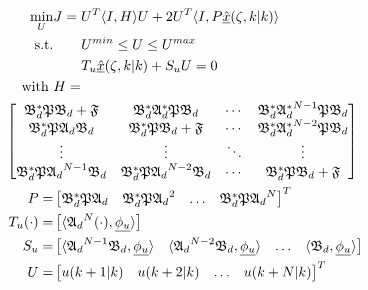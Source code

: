 \begin{equation} \label{eq:MPC_QP}
    \begin{aligned}
        \min_{U} &J = U^T \langle I,H \rangle U + 2U^T \langle I, P \underline{\hat{x}}(\zeta, k|k) \rangle \\
        \text{s.t.} &\qquad U^{min} \leq U \leq U^{max} \\
        &\qquad T_u \underline{\hat{x}}(\zeta, k|k) + S_u U = 0
        \, \\
        \text{with } &H = \\
        &\hspace{-3.5em }\begin{bmatrix}
            \mathfrak{B}_d^* \mathfrak{P} \mathfrak{B}_d + \mathfrak{F} & \mathfrak{B}_d^* \mathfrak{A}_d^* \mathfrak{P} \mathfrak{B}_d & \cdots &  \mathfrak{B}_d^* {\mathfrak{A}_d^*}^{N-1} \mathfrak{P} \mathfrak{B}_d \\
            \mathfrak{B}_d^* \mathfrak{P} \mathfrak{A}_d \mathfrak{B}_d & \mathfrak{B}_d^* \mathfrak{P} \mathfrak{B}_d + \mathfrak{F} & \cdots & \mathfrak{B}_d^* {\mathfrak{A}_d^*}^{N-2} \mathfrak{P} \mathfrak{B}_d \\
            \vdots & \vdots & \ddots & \vdots \\
            \mathfrak{B}_d^* \mathfrak{P} {\mathfrak{A}_d}^{N-1} \mathfrak{B}_d & \mathfrak{B}_d^* \mathfrak{P} {\mathfrak{A}_d}^{N-2} \mathfrak{B}_d & \cdots & \mathfrak{B}_d^* \mathfrak{P} \mathfrak{B}_d + \mathfrak{F}
        \end{bmatrix} \\
        P = &\begin{bmatrix}
            \mathfrak{B}_d^* \mathfrak{P} {\mathfrak{A}_d} &
            \mathfrak{B}_d^* \mathfrak{P} {\mathfrak{A}_d}^{2}  &
            \hdots &
            \mathfrak{B}_d^* \mathfrak{P} {\mathfrak{A}_d}^{N} 
        \end{bmatrix}^T \\
        T_u (\cdot) = &\begin{bmatrix}
            \langle {\mathfrak{A}_d}^{N} (\cdot), \underline{\phi_u} \rangle
        \end{bmatrix} \\
        S_u = &\begin{bmatrix}
            \langle {\mathfrak{A}_d}^{N-1} \mathfrak{B}_d, \underline{\phi_u} \rangle & 
            \langle {\mathfrak{A}_d}^{N-2} \mathfrak{B}_d, \underline{\phi_u} \rangle &
            \hdots &
            \langle \mathfrak{B}_d, \underline{\phi_u} \rangle
        \end{bmatrix} \\
        U = &\begin{bmatrix}
            u(k+1|k) & u(k+2|k) & \hdots & u(k+N|k)
        \end{bmatrix}^T
    \end{aligned}
\end{equation}

